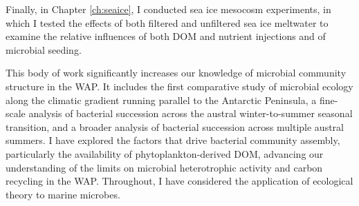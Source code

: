 Finally, in Chapter \ref{ch:seaice}, I conducted sea ice mesocosm experiments, in which I tested the effects of both filtered and unfiltered sea ice meltwater to examine the relative influences of both DOM and nutrient injections and of microbial seeding.
 
This body of work significantly increases our knowledge of microbial community structure in the WAP. It includes the first comparative study of microbial ecology along the climatic gradient running parallel to the Antarctic Peninsula, a fine-scale analysis of bacterial succession across the austral winter-to-summer seasonal transition, and a broader analysis of bacterial succession across multiple austral summers. I have explored the factors that drive bacterial community assembly, particularly the availability of phytoplankton-derived DOM, advancing our understanding of the limits on microbial heterotrophic activity and carbon recycling in the WAP. Throughout, I have considered the application of ecological theory to marine microbes.
